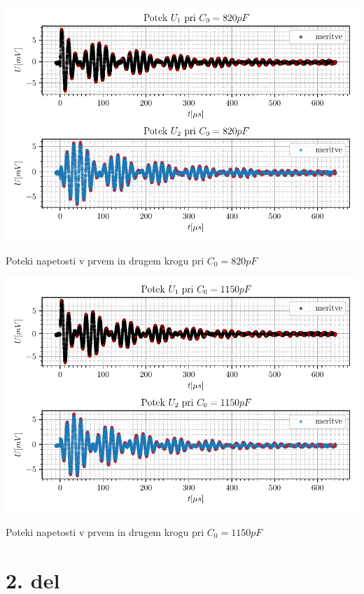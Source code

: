 \documentclass[12pt]{report}
\begin{document}
\begin{slika}[H]
  \centering
  \includegraphics{C820}
  \caption{\small Poteki napetosti v prvem in drugem krogu pri $C_0 = 820\si{pF}$}
\end{slika}

\begin{slika}[H]
  \centering
  \includegraphics{C1150}
  \caption{\small Poteki napetosti v prvem in drugem krogu pri $C_0 = 1150\si{pF}$}
\end{slika}

\section*{2. del}
\end{document}
